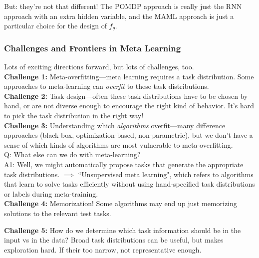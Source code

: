 But: they're not that different! The POMDP approach is really just the RNN approach with an extra hidden variable, and the MAML approach is just a particular choice for the design of $f_\theta$. \\

\subsubsection{Challenges and Frontiers in Meta Learning}

Lots of exciting directions forward, but lots of challenges, too. \\

{\bf Challenge 1:} Meta-overfitting---meta learning requires a task distribution. Some approaches to meta-learning can {\it overfit} to these task distributions.\\

{\bf Challenge 2:} Task design---often these task distributions have to be chosen by hand, or are not diverse enough to encourage the right kind of behavior. It's hard to pick the task distribution in the right way! \\

{\bf Challenge 3:} Understanding which {\it algorithms} overfit---many difference approaches (black-box, optimization-based, non-parametric), but we don't have a sense of which kinds of algorithms are most vulnerable to meta-overfitting. \\

Q: What else can we do with meta-learning? \\

A1: Well, we might automatically propose tasks that generate the appropriate task distributions. $\implies$ ``Unsupervised meta learning", which refers to algorithms that learn to solve tasks efficiently without using hand-specified task distributions or labels during meta-training. \\

{\bf Challenge 4:} Memorization! Some algorithms may end up just memorizing solutions to the relevant test tasks.

{\bf Challenge 5:} How do we determine which task information should be in the input vs in the data? Broad task distributions can be useful, but makes exploration hard. If their too narrow, not representative enough. \\



\spacerule
